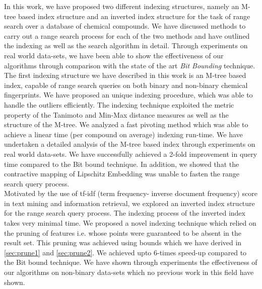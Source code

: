 %
%
In this work, we have proposed two different indexing structures, namely an M-tree based index structure and an inverted index structure for the task of range search over a database of chemical compounds. We have discussed methods to carry out a range search process for each of the two methods and have outlined the indexing as well as the search algorithm in detail. Through experiments on real world data-sets, we have been able to show the effectiveness of our algorithms through comparison with the state of the art\textit{ Bit Bounding} technique.\\

The first indexing structure we have described in this work is an  M-tree based index, capable of range search queries on both binary and non-binary chemical fingerprints. We have proposed an unique indexing procedure, which was able to handle the outliers efficiently. The indexing technique exploited the metric property of the Tanimoto and Min-Max distance measures as well as the structure of the M-tree. We analyzed a fast pivoting method which was able to achieve a linear time (per compound on average) indexing run-time. We have undertaken a detailed analysis of the M-tree based index through experiments on real world data-sets. We have successfully achieved a 2-fold improvement in query time compared to the Bit bound technique. In addition, we showed that the contractive mapping of Lipschitz Embedding was unable to fasten the range search query process. \\

Motivated by the use of tf-idf (term frequency- inverse document frequency) score in text mining and information retrieval, we explored an inverted index structure for the range search query process. The indexing process of the inverted index takes very minimal time. We proposed a novel indexing technique which relied on the pruning of features i.e. whose points were guaranteed to be absent in the result set. This pruning was achieved using bounds which we have derived in \autoref{sec:prune1} and \autoref{sec:prune2}. We achieved upto 6-times speed-up compared to the Bit bound technique. We have shown through experiments the effectiveness of our algorithms on non-binary data-sets which no previous work in this field have shown. \\
 
